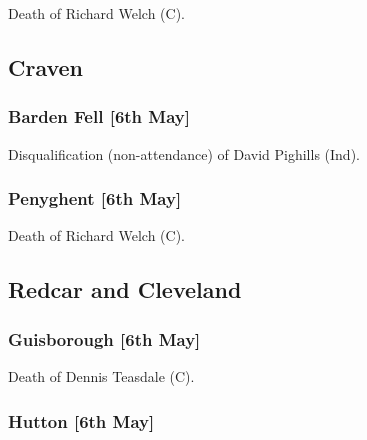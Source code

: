 \documentclass[a4paper,openany]{book}
\begin{document}
\begin{resultsiii}
Death of Richard Welch (C).

\subsection*{Craven}

\subsubsection*{Barden Fell \hspace*{\fill}\nolinebreak[1]%
	\enspace\hspace*{\fill}
	[6th May]}


Disqualification (non-attendance) of David Pighills (Ind).

\subsubsection*{Penyghent \hspace*{\fill}\nolinebreak[1]%
	\enspace\hspace*{\fill}
	[6th May]}


Death of Richard Welch (C).

\subsection*{Redcar and Cleveland}

\subsubsection*{Guisborough \hspace*{\fill}\nolinebreak[1]%
	\enspace\hspace*{\fill}
	[6th May]}


Death of Dennis Teasdale (C).

\subsubsection*{Hutton \hspace*{\fill}\nolinebreak[1]%
	\enspace\hspace*{\fill}
	[6th May]}


\end{resultsiii}
\end{document}
